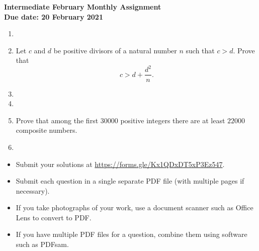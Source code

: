 \documentclass{article}
\begin{document}
\thispagestyle{empty}

\begin{center}
  \textbf{\Large Intermediate February Monthly Assignment}
  \\ \vspace{1em}
  \textbf{\large Due date: 20 February 2021}
\end{center}

\vspace{12pt}

\begin{enumerate}[1.]

\item %


\item %
Let $c$ and $d$ be positive divisors of a natural number $n$ such that $c > d$. Prove that $$c > d + \frac{d^2}{n}.$$


\item %


\item %


\item %
Prove that among the first $30000$ positive integers there are at least $22000$ composite numbers.


\item %


\end{enumerate}


\vfill
\begin{itemize}
	\item Submit your solutions at \url{https://forms.gle/Kx1QDxDT5xP3Ez547}.
	\item Submit each question in a single separate PDF file (with multiple pages if necessary).
	\item If you take photographs of your work, use a document scanner such as Office Lens to convert to PDF.
	\item If you have multiple PDF files for a question, combine them using software such as PDFsam.
\end{itemize}
\end{document}
